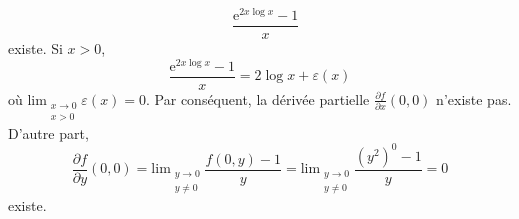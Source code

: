 {\begin{enumerate}
{\[{\begin{smallmatrix}
\end{smallmatrix}}\frac {\mathrm e^{2x \log x} -1}x
\]
existe. Si $x>0$,
\[
\frac {\mathrm e^{2x \log x} -1}x = 2 \log x + \varepsilon(x)
\]
o\`u $\mathrm{lim}_{\begin{smallmatrix} x \to 0\\ x > 0
\end{smallmatrix}}\varepsilon(x)=0$. Par cons\'equent,
 la d\'eriv\'ee partielle
$\frac{\partial f}{\partial x}(0,0)$ n'existe pas.
D'autre part,
\[
\frac{\partial f}{\partial y}(0,0)=
\mathrm{lim}_{\begin{smallmatrix} y \to 0\\ y \ne 0
\end{smallmatrix}}\frac {f(0,y) -1}y =
\mathrm{lim}_{\begin{smallmatrix} y \to 0\\ y \ne 0
\end{smallmatrix}}\frac {(y^2)^0-1}y = 0
\]
existe.}
\end{enumerate}
}
